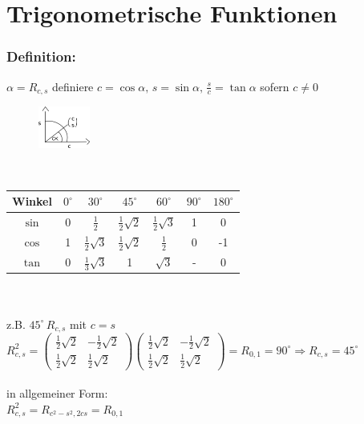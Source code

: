 \section{Trigonometrische Funktionen}
%
%
%
\subsubsection{Definition:}
$\alpha = R_{c,s}$ definiere $c=\cos \alpha, \, s=\sin\alpha, \, \frac{s}{c}=\tan\alpha$  sofern $c \neq 0$
%
 \begin{figure}[H]
 \centering
\includegraphics[width=0.15\textwidth]{mainmatter/chapter1/pics/trigo1.png}
\end{figure}
%
\qquad\\
 \begin{tabular}{|c|c|c|c|c|c|c|}
 \hline
Winkel & $0^{\circ}$ & $30^{\circ}$ & $45^{\circ}$ & $60^{\circ}$ & $90^{\circ}$ & $180^{\circ}$\\\hline
$\sin$ & 0 & $\frac{1}{2}$ & $\frac{1}{2}\sqrt{2}$ & $\frac{1}{2} \sqrt{3}$ & 1 & 0\\\hline
$\cos$ & 1 & $\frac{1}{2} \sqrt{3}$ &$\frac{1}{2}\sqrt{2}$ &  $\frac{1}{2}$  & 0 & -1\\\hline
$\tan$ & 0 &$\frac{1}{3}\sqrt{3}$ & 1 & $\sqrt{3}$ & - & 0 \\\hline
 \end{tabular}\\
 \qquad\\
 z.B. $45^{\circ} \, R_{c,s}$ mit $c=s$ \\
$R^{2}_{c,s} = \begin{pmatrix} \frac{1}{2}\sqrt{2} & - \frac{1}{2}\sqrt{2} \\ \frac{1}{2}\sqrt{2} & \frac{1}{2}\sqrt{2} \end{pmatrix}\begin{pmatrix} \frac{1}{2}\sqrt{2} & - \frac{1}{2}\sqrt{2} \\ \frac{1}{2}\sqrt{2} & \frac{1}{2}\sqrt{2} \end{pmatrix} = R_{0,1}= 90^{\circ} \Rightarrow R_{c,s} = 45^{\circ}$ \\
\qquad\\
 in allgemeiner Form:\\
 $ R^{2}_{c,s} = R_{c^{2}-s^{2},2cs}=R_{0,1}$\\
 \qquad\\
